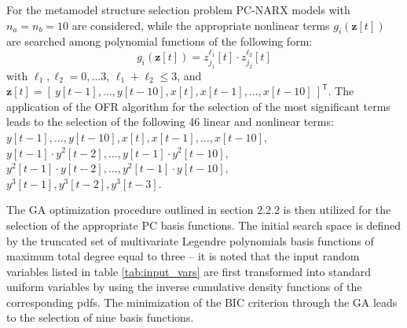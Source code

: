 \documentclass[12pt,a4paper,twocolumn,fleqn]{narms}
\newcommand{\bld}[1]{\boldsymbol{#1}}
\begin{document}
For the metamodel structure selection problem PC-NARX models with $n_a = n_b = 10 $ are considered, while the appropriate nonlinear terms $g_i({\bld z}[t])$ are searched among polynomial functions of the following form:
%
$$ g_i({\bld z}[t]) = z_{j_1}^{\ell_1}[t] \cdot z_{j_2}^{\ell_2}[t]$$
%
with $\ell_1,\ell_2 = 0,\ldots 3$, $\ell_1 + \ell_2 \leq 3$, and ${\bld z}[t] = \left[ \ y[t-1], \ldots, y[t-10], x[t], x[t-1], \ldots, x[t-10]\ \right]^{\mathsf{T}}$. The application of the OFR algorithm for the selection of the most significant terms leads to the selection of the following 46 linear and nonlinear terms:
%
$y[t-1], \ldots,y[t-10], x[t], x[t-1], \ldots,x[t-10],$ \vspace{0.2cm} \\
%
$y[t-1]\cdot y^2[t-2], \ldots, y[t-1]\cdot y^2[t-10],$ \vspace{0.2cm} \\
%
$y^2[t-1]\cdot y[t-2], \ldots, y^2[t-1]\cdot y[t-10],$ \vspace{0.2cm} \\
$y^3[t-1], y^3[t-2], y^3[t-3].$

The GA optimization procedure outlined in section 2.2.2 is then utilized for the selection of the appropriate PC basis functions. The initial search space is defined by the truncated set of multivariate Legendre polynomials basis functions of maximum total degree equal to three -- it is noted that the input random variables listed in table \ref{tab:input_vars} are first transformed into standard uniform variables by using the inverse cumulative density functions of the corresponding pdfs. The minimization of the BIC criterion through the GA leads to the selection of nine basis functions. 
\end{document}
